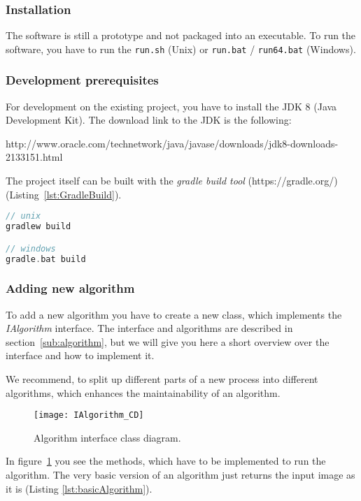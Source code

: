 \subsubsection{Installation}
The software is still a prototype and not packaged into an executable. To run the software, you have to run the \texttt{run.sh} (Unix) or \texttt{run.bat} / \texttt{run64.bat}  (Windows).

\subsubsection{Development prerequisites}
For development on the existing project, you have to install the JDK 8 (Java Development Kit). The download link to the JDK is the following:

http://www.oracle.com/technetwork/java/javase/downloads/jdk8-downloads-2133151.html

The project itself can be built with the \textit{gradle build tool} (https://gradle.org/) (Listing~\ref{lst:GradleBuild}).

\begin{lstlisting}[caption={Gradle build tool build of the project.}, label={lst:GradleBuild}, language=Kotlin]
// unix
gradlew build

// windows
gradle.bat build
\end{lstlisting}

\subsubsection{Adding new algorithm}
To add a new algorithm you have to create a new class, which implements the \textit{IAlgorithm} interface. The interface and algorithms are described in section~\ref{sub:algorithm}, but we will give you here a short overview over the interface and how to implement it.

We recommend, to split up different parts of a new process into different algorithms, which enhances the maintainability of an algorithm.

\begin{figure}[H]
  \centering
      \texttt{[image: IAlgorithm\_CD]}
  \caption{Algorithm interface class diagram.}
  \label{fig:IAlgorithm_CD_DG}
\end{figure}

In figure~\ref{fig:IAlgorithm_CD_DG} you see the methods, which have to be implemented to run the algorithm. The very basic version of an algorithm just returns the input image as it is (Listing \ref{lst:basicAlgorithm}).


